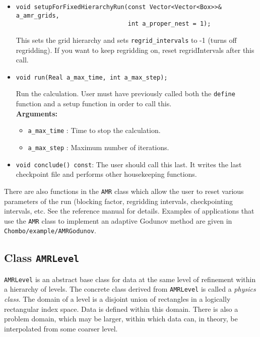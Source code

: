 \begin{itemize}
\item
\begin{verbatim}
void setupForFixedHierarchyRun(const Vector<Vector<Box>>& a_amr_grids,
                               int a_proper_nest = 1);
\end{verbatim}
This sets the grid hierarchy and sets \verb/regrid_intervals/ to -1
(turns off regridding).  If you want to keep regridding
on, reset regridIntervals after this call.

\item
\begin{verbatim}
void run(Real a_max_time, int a_max_step);
\end{verbatim}
Run the calculation.  User must have previously called both the \verb|define|
function and a setup function in order to call this.
\\ {\bf Arguments:} 
  \begin{itemize}
  \item
  \verb/a_max_time/ :
  Time to stop the calculation.
  \item
  \verb/a_max_step/ :
  Maximum number of iterations.
  \end{itemize}

\item
\verb/void conclude() const/:
The user should call this last.  It writes the last checkpoint file
and performs other housekeeping functions.

\end{itemize}

There are also functions in the {\tt AMR} class which allow the user to reset
various parameters of the run (blocking factor, regridding 
intervals, checkpointing intervals, etc.  See the reference
manual for details.  Examples of applications that
use the \verb|AMR| class to implement an adaptive Godunov method
are given in {\tt Chombo/example/AMRGodunov}.

\subsection{Class {\tt AMRLevel}}
{\tt AMRLevel} is an abstract base class for data at the same level of
refinement within a hierarchy of levels.  The concrete class
derived from {\tt AMRLevel} is called a {\em physics class}.  The domain
of a level is a disjoint union of rectangles in a logically
rectangular index space.  Data is defined within this domain.
There is also a problem domain, which may be larger, within which
data can, in theory, be interpolated from some coarser level.

